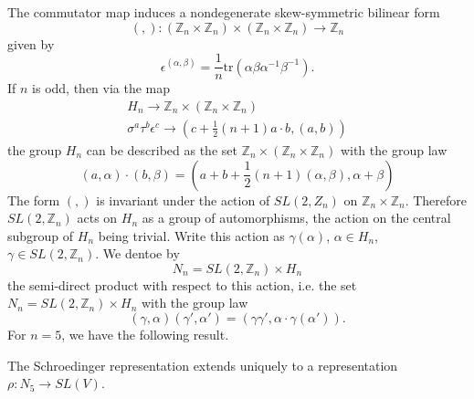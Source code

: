 The commutator map induces a nondegenerate skew-symmetric bilinear form
$$
(,):(\mathbb{Z}_{n}\times \mathbb{Z}_{n})\times
(\mathbb{Z}_{n}\times \mathbb{Z}_{n})\to \mathbb{Z}_{n}
$$\pageoriginale
given by
$$
\epsilon^{(\alpha,\beta)}=\frac{1}{n}\text{tr}(\alpha\beta\alpha^{-1}\beta^{-1}). 
$$
If $n$ is odd, then via the map
\begin{gather*}
H_{n}\to \mathbb{Z}_{n}\times (\mathbb{Z}_{n}\times \mathbb{Z}_{n})\\
\sigma^{a}\tau^{b}\epsilon^{c}\to \left(c+\frac{1}{2}(n+1)a\cdot
b,(a,b)\right) 
\end{gather*}
the group $H_{n}$ can be described as the set $\mathbb{Z}_{n}\times
(\mathbb{Z}_{n}\times \mathbb{Z}_{n})$ with the group law
$$
(a,\alpha)\cdot
(b,\beta)=\left(a+b+\frac{1}{2}(n+1)(\alpha,\beta),\alpha+\beta\right) 
$$
The form $(,)$ is invariant under the action of $SL(2,Z_{n})$ on
$\mathbb{Z}_{n}\times \mathbb{Z}_{n}$. Therefore
$SL(2,\mathbb{Z}_{n})$ acts on $H_{n}$ as a group of automorphisms,
the action on the central subgroup of $H_{n}$ being trivial. Write
this action as $\gamma(\alpha)$, $\alpha\in H_{n}$, $\gamma\in
SL(2,\mathbb{Z}_{n})$. We dentoe by
$$
N_{n}=SL(2,\mathbb{Z}_{n})\times H_{n}
$$
the semi-direct product with respect to this action, i.e. the set
$N_{n}=SL(2,\mathbb{Z}_{n})\times H_{n}$ with the group law
$$
(\gamma,\alpha)(\gamma',\alpha')=(\gamma\gamma',\alpha\cdot \gamma(\alpha')).
$$\pageoriginale
For $n=5$, we have the following result.

\begin{lemma}[6, \S 1]\label{chap2-lem2}
The Schroedinger representation extends uniquely to a representation
$\rho:N_{5}\to SL(V)$. 
\end{lemma}

